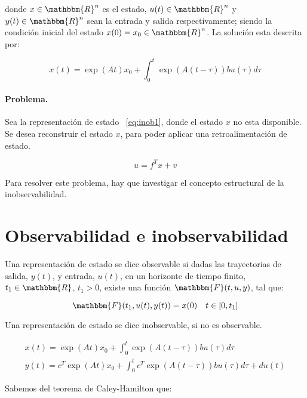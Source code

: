 	donde $x \in \mathbbm{R}^n$ es el estado, $u(t) \in \mathbbm{R}^n$ y $y(t) \in \mathbbm{R}^n$ sean la entrada y salida respectivamente; siendo la condición inicial del estado $x(0) = x_0 \in \mathbbm{R}^n$. La solución esta descrita por:

	\begin{equation*}
		x(t) = \exp{(At)} x_0 + \int_0^t \exp{\left(A(t - \tau)\right)} b u(\tau) d\tau
	\end{equation*}

	\paragraph{Problema.}

	Sea la representación de estado ~\ref{eq:inob1}, donde el estado $x$ no esta disponible. Se desea reconstruir el estado $x$, para poder aplicar una retroalimentación de estado.

	\begin{equation}
		u = f^T x + v
	\end{equation}

	Para resolver este problema, hay que investigar el concepto estructural de la inobservabilidad.

	\newpage
    \section{Observabilidad e inobservabilidad}

    Una representación de estado se dice observable si dadas las trayectorias de salida, $y(t)$, y entrada, $u(t)$, en un horizonte de tiempo finito, $t_1 \in \mathbbm{R}$, $t_1 > 0$, existe una función $\mathbbm{F}(t, u, y)$, tal que:

    \begin{equation}
    	\mathbbm{F}(t_1, u(t), y(t)) = x(0) \quad t \in [0, t_1]
    \end{equation}

    Una representación de estado se dice inobservable, si no es observable.

    \begin{eqnarray} \label{eq:inob2}
		x(t) = \exp{(At)} x_0 + \int_0^t \exp{\left(A(t - \tau)\right)} b u(\tau) d\tau \nonumber \\
		y(t) = c^T \exp{(At)} x_0 + \int_0^t c^T \exp{\left(A(t - \tau)\right)} b u(\tau) d\tau +d u(t)
	\end{eqnarray}

	Sabemos del teorema de Caley-Hamilton que:

